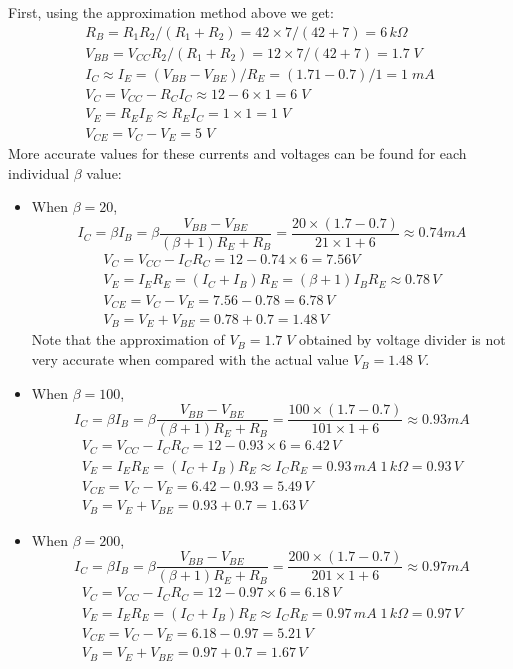 \begin{itemize}
First, using the approximation method above we get:
\[ 
\begin{array}{l} R_B=R_1R_2/(R_1+R_2)=42\times 7/(42+7)=6\,k\Omega	\\
  V_{BB}=V_{CC} R_2/(R_1+R_2)=12\times 7/(42+7)=1.7\;V\\
  I_C \approx I_E=(V_{BB}-V_{BE})/R_E=(1.71-0.7)/1=1\;mA\\
  V_C=V_{CC}-R_CI_C\approx 12-6\times 1=6\;V\\
  V_E=R_EI_E\approx R_E I_C=1\times 1=1\;V \\
  V_{CE}=V_C-V_E=5\;V \end{array} 
\]
More accurate values for these currents and voltages can be found for each 
individual $\beta$ value:
\begin{itemize}
\item When $\beta=20$, 
  \[
  I_C=\beta I_B=\beta \frac{V_{BB}-V_{BE}}{(\beta+1) R_E+R_B}
  =\frac{20\times (1.7-0.7)}{21\times 1+6}
  \approx 0.74 mA	
  \]
  \[
  \begin{array}{l} 
    V_C=V_{CC}-I_CR_C=12-0.74 \times 6=7.56 V	\\
    V_E=I_E R_E=(I_C+I_B)R_E=(\beta+1)I_B R_E\approx 0.78\,V \\
    V_{CE}=V_C-V_E=7.56-0.78=6.78\,V \\
    V_B=V_E+V_{BE}=0.78+0.7=1.48\,V
  \end{array} 
  \]
  Note that the approximation of $V_B=1.7\;V$ obtained by voltage divider
  is not very accurate when compared with the actual value 
  $V_B=1.48\;V$.

\item When $\beta=100$, 
  \[ 
  I_C=\beta I_B=\beta \frac{V_{BB}-V_{BE}}{(\beta+1) R_E+R_B}
  =\frac{100\times (1.7-0.7)}{101\times 1+6} \approx 0.93 mA	
  \]
  \[ \begin{array}{l} 
    V_C=V_{CC}-I_CR_C=12-0.93 \times 6=6.42\,V	\\
    V_E=I_E R_E=(I_C+I_B)R_E\approx I_C R_E = 0.93\,mA\;1\,k\Omega=0.93\,V \\
    V_{CE}=V_C-V_E=6.42-0.93=5.49\,V \\
    V_B=V_E+V_{BE}=0.93+0.7=1.63\,V
  \end{array} 
  \]

\item When $\beta=200$, 
  \[
  I_C=\beta I_B=\beta\frac{V_{BB}-V_{BE}}{(\beta+1) R_E+R_B}
  =\frac{200\times (1.7-0.7)}{201\times 1+6}\approx 0.97 mA	
  \]
  \[ 
  \begin{array}{l} 
    V_C=V_{CC}-I_CR_C=12-0.97 \times 6=6.18\,V	\\
    V_E=I_E R_E=(I_C+I_B)R_E\approx I_C R_E=0.97\,mA\;1\,k\Omega=0.97\,V \\
    V_{CE}=V_C-V_E=6.18-0.97=5.21\,V \\
    V_B=V_E+V_{BE}=0.97+0.7=1.67\,V
  \end{array} 
  \]
\end{itemize}

\end{itemize}

